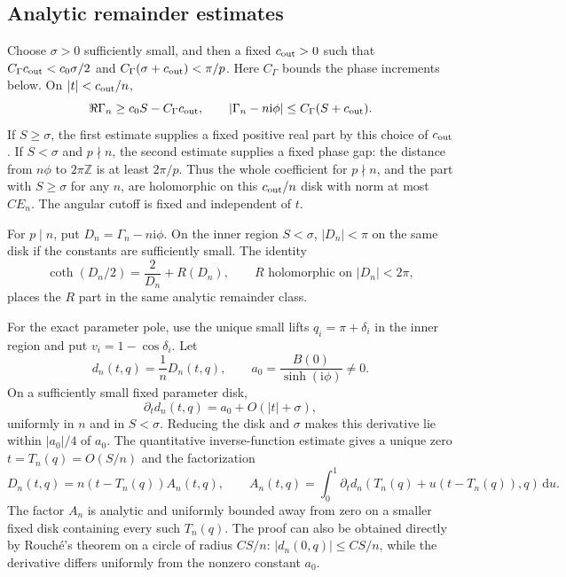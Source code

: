 \documentclass[11pt]{article}
\numberwithin{equation}{section}
\theoremstyle{definition}
\newcommand{\Z}{\mathbb Z}
\newcommand{\dd}{\,\mathrm d}
\newcommand{\ii}{\mathrm i}
\begin{document}
\subsection{Analytic remainder estimates}

Choose $\sigma>0$ sufficiently small, and then a fixed
$c_{\rm out}>0$ such that
$C_\Gamma c_{\rm out}<c_0\sigma/2$ and
$C_\Gamma(\sigma+c_{\rm out})<\pi/p$.
Here $C_\Gamma$ bounds the phase increments below. On
$|t|<c_{\rm out}/n$,
\begin{equation}\label{eq:jets_c_over_n_estimate}
 \Re\Gamma_n\ge c_0S-C_\Gamma c_{\rm out},\qquad
 |\Gamma_n-n\ii\phi|\le C_\Gamma(S+c_{\rm out}).
\end{equation}
If $S\ge\sigma$, the first estimate supplies a fixed positive real
part by this choice of $c_{\rm out}$. If $S<\sigma$ and $p\nmid n$, the
second estimate supplies a fixed phase gap: the distance from
$n\phi$ to $2\pi\Z$ is at least $2\pi/p$. Thus the whole
coefficient for $p\nmid n$, and the part with $S\ge\sigma$ for any
$n$, are holomorphic on this $c_{\rm out}/n$ disk with norm at most $CE_n$.
The angular cutoff is fixed and independent of $t$.

For $p\mid n$, put $D_n=\Gamma_n-n\ii\phi$. On the inner region
$S<\sigma$, $|D_n|<\pi$ on the same disk if the constants are
sufficiently small. The identity
\begin{equation}\label{eq:jets_coth_subtraction}
 \coth(D_n/2)=\frac2{D_n}+R(D_n),
 \qquad R \text{ holomorphic on } |D_n|<2\pi,
\end{equation}
places the $R$ part in the same analytic remainder class.

For the exact parameter pole, use the unique small lifts
$q_i=\pi+\delta_i$ in the inner region and put $v_i=1-\cos\delta_i$. Let
\[
 d_n(t,q)=\frac1nD_n(t,q),\qquad
 a_0=\frac{B(0)}{\sinh(\ii\phi)}\ne0.
\]
On a sufficiently small fixed parameter disk,
\[
 \partial_t d_n(t,q)=a_0+O(|t|+\sigma),
\]
uniformly in $n$ and in $S<\sigma$. Reducing the disk and $\sigma$
makes this derivative lie within $|a_0|/4$ of $a_0$. The quantitative
inverse-function estimate gives a unique zero
$t=T_n(q)=O(S/n)$ and the factorization
\begin{equation}\label{eq:jets_exact_pole_factor}
 D_n(t,q)=n(t-T_n(q))A_n(t,q),\qquad
 A_n(t,q)=\int_0^1\partial_t d_n
       (T_n(q)+u(t-T_n(q)),q)\dd u.
\end{equation}
The factor $A_n$ is analytic and uniformly bounded away from zero on
a smaller fixed disk containing every such $T_n(q)$. The proof can
also be obtained directly by Rouch\'e's theorem on a circle of radius
$CS/n$: $|d_n(0,q)|\le CS/n$, while the derivative differs uniformly
from the nonzero constant $a_0$.
\end{document}
